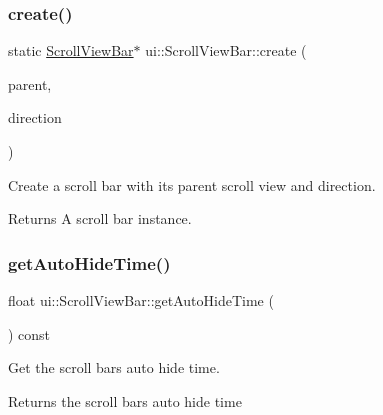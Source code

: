 \subsubsection{\texorpdfstring{create()}{create()}\hspace{0.1cm}{\footnotesize\ttfamily [2/2]}}
{\footnotesize\ttfamily static \hyperlink{classui_1_1ScrollViewBar}{Scroll\+View\+Bar}$\ast$ ui\+::\+Scroll\+View\+Bar\+::create (\begin{DoxyParamCaption}\item[{\hyperlink{classui_1_1ScrollView}{Scroll\+View} $\ast$}]{parent,  }\item[{\hyperlink{classui_1_1ScrollView_aed2d778ae8098dcafe323b2beae8dd6b}{Scroll\+View\+::\+Direction}}]{direction }\end{DoxyParamCaption})\hspace{0.3cm}{\ttfamily [static]}}

Create a scroll bar with its parent scroll view and direction. \begin{DoxyReturn}{Returns}
A scroll bar instance. 
\end{DoxyReturn}
\mbox{\label{classui_1_1ScrollViewBar_ac1fcff0b4e6907a3db3c5bfab513fa07}} 
\subsubsection{\texorpdfstring{get\+Auto\+Hide\+Time()}{getAutoHideTime()}\hspace{0.1cm}{\footnotesize\ttfamily [1/2]}}
{\footnotesize\ttfamily float ui\+::\+Scroll\+View\+Bar\+::get\+Auto\+Hide\+Time (\begin{DoxyParamCaption}{ }\end{DoxyParamCaption}) const\hspace{0.3cm}{\ttfamily [inline]}}



Get the scroll bar\textquotesingle{}s auto hide time. 

\begin{DoxyReturn}{Returns}
the scroll bar\textquotesingle{}s auto hide time 
\end{DoxyReturn}
\mbox{\label{classui_1_1ScrollViewBar_ac1fcff0b4e6907a3db3c5bfab513fa07}} 
